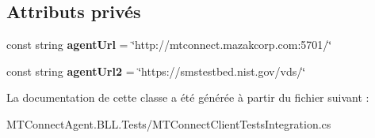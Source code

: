 \subsection*{Attributs privés}
\begin{DoxyCompactItemize}
\item 
\mbox{\label{class_m_t_connect_agent_1_1_b_l_l_1_1_tests_1_1_m_t_connect_client_tests_integration_afac92579eb2162e9af64ddc9cd443f0c}} 
const string {\bfseries agent\+Url} = \char`\"{}http\+://mtconnect.\+mazakcorp.\+com\+:5701/\char`\"{}
\item 
\mbox{\label{class_m_t_connect_agent_1_1_b_l_l_1_1_tests_1_1_m_t_connect_client_tests_integration_acfdfc41bb8b8bc881724656cef4d823b}} 
const string {\bfseries agent\+Url2} = \char`\"{}https\+://smstestbed.\+nist.\+gov/vds/\char`\"{}
\end{DoxyCompactItemize}


La documentation de cette classe a été générée à partir du fichier suivant \+:\begin{DoxyCompactItemize}
\item 
M\+T\+Connect\+Agent.\+B\+L\+L.\+Tests/M\+T\+Connect\+Client\+Tests\+Integration.\+cs\end{DoxyCompactItemize}
